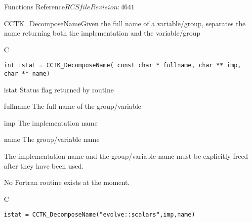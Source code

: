 \begin{cactuspart}{ Functions Reference}{$RCSfile$}{$Revision: 4641 $}


\begin{FunctionDescription}{CCTK\_DecomposeName}{Given the full name of a variable/group, separates the name returning both the implementation and the variable/group}
\label{CCTK-DecomposeName}
\begin{SynopsisSection}
\begin{Synopsis}{C}
\begin{verbatim}int istat = CCTK_DecomposeName( const char * fullname, char ** imp, char ** name)\end{verbatim}
\end{Synopsis}
\end{SynopsisSection}
\begin{ParameterSection}
\begin{Parameter}{istat}
Status flag returned by routine
\end{Parameter}
\begin{Parameter}{fullname}
The full name of the group/variable
\end{Parameter}
\begin{Parameter}{imp}
The implementation name
\end{Parameter}
\begin{Parameter}{name}
The group/variable name
\end{Parameter}
\end{ParameterSection}
\begin{Discussion}
The implementation name and the group/variable name must be
explicitly freed after they have been used.

No Fortran routine exists at the moment.
\end{Discussion}
\begin{ExampleSection}
\begin{Example}{C}
\begin{verbatim}
istat = CCTK_DecomposeName("evolve::scalars",imp,name)
\end{verbatim}
\end{Example}
\end{ExampleSection}
\end{FunctionDescription}



\end{cactuspart}
